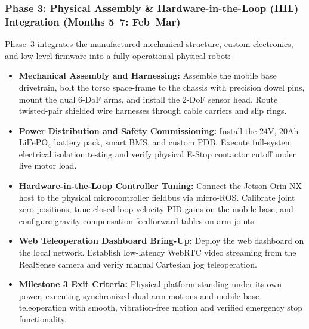 \subsubsection{Phase 3: Physical Assembly \& Hardware-in-the-Loop (HIL) Integration (Months 5--7: Feb--Mar)}
Phase~3 integrates the manufactured mechanical structure, custom electronics, and low-level firmware into a fully operational physical robot:
\begin{itemize}[leftmargin=1.5em]
  \item \textbf{Mechanical Assembly and Harnessing:} Assemble the mobile base drivetrain, bolt the torso space-frame to the chassis with precision dowel pins, mount the dual 6-DoF arms, and install the 2-DoF sensor head. Route twisted-pair shielded wire harnesses through cable carriers and slip rings.
  \item \textbf{Power Distribution and Safety Commissioning:} Install the $24\text{V}$, $20\text{Ah}$ $\text{LiFePO}_4$ battery pack, smart BMS, and custom PDB. Execute full-system electrical isolation testing and verify physical E-Stop contactor cutoff under live motor load.
  \item \textbf{Hardware-in-the-Loop Controller Tuning:} Connect the Jetson Orin NX host to the physical microcontroller fieldbus via micro-ROS. Calibrate joint zero-positions, tune closed-loop velocity PID gains on the mobile base, and configure gravity-compensation feedforward tables on arm joints.
  \item \textbf{Web Teleoperation Dashboard Bring-Up:} Deploy the web dashboard on the local network. Establish low-latency WebRTC video streaming from the RealSense camera and verify manual Cartesian jog teleoperation.
  \item \textbf{Milestone 3 Exit Criteria:} Physical platform standing under its own power, executing synchronized dual-arm motions and mobile base teleoperation with smooth, vibration-free motion and verified emergency stop functionality.
\end{itemize}

